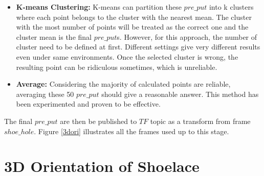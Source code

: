 \begin{itemize}
    \item \textbf{K-means Clustering:} K-means can partition these $pre\_put$ into k clusters where each point belongs to the cluster with the nearest mean. The cluster with the most number of points will be treated as the correct one and the cluster mean is the final $pre\_put$s. However, for this approach, the number of cluster need to be defined at first. Different settings give very different results even under same environments. Once the selected cluster is wrong, the resulting point can be ridiculous sometimes, which is unreliable.
    
    \item \textbf{Average:} Considering the majority of calculated points are reliable, averaging these 50 $pre\_put$ should give a reasonable answer. This method has been experimented and proven to be effective.
\end{itemize}

The final $pre\_put$ are then be published to $TF$ topic as a transform from frame $shoe\_hole$. Figure \ref{3dori} illustrates all the frames used up to this stage.

\section{3D Orientation of Shoelace}